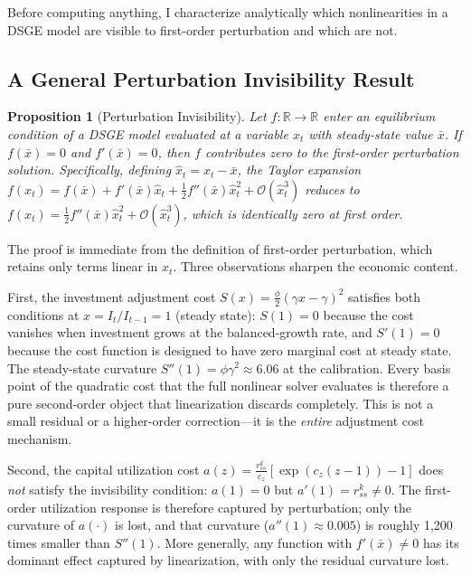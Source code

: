 \documentclass[12pt]{article}
\theoremstyle{plain}
\newtheorem{proposition}[theorem]{Proposition}
\theoremstyle{definition}
\theoremstyle{remark}
\begin{document}
Before computing anything, I characterize analytically which nonlinearities in a DSGE model are visible to first-order perturbation and which are not.

\subsection{A General Perturbation Invisibility Result}

\begin{proposition}[Perturbation Invisibility]
\label{prop:invisibility}
Let $f: \mathbb{R} \to \mathbb{R}$ enter an equilibrium condition of a DSGE model evaluated at a variable $x_t$ with steady-state value $\bar{x}$. If $f(\bar{x}) = 0$ and $f'(\bar{x}) = 0$, then $f$ contributes zero to the first-order perturbation solution. Specifically, defining $\hat{x}_t = x_t - \bar{x}$, the Taylor expansion $f(x_t) = f(\bar{x}) + f'(\bar{x})\hat{x}_t + \tfrac{1}{2}f''(\bar{x})\hat{x}_t^2 + \mathcal{O}(\hat{x}_t^3)$ reduces to $f(x_t) = \tfrac{1}{2}f''(\bar{x})\hat{x}_t^2 + \mathcal{O}(\hat{x}_t^3)$, which is identically zero at first order.
\end{proposition}

The proof is immediate from the definition of first-order perturbation, which retains only terms linear in $\hat{x}_t$. Three observations sharpen the economic content.

First, the investment adjustment cost $S(x) = \tfrac{\phi}{2}(\gamma x - \gamma)^2$ satisfies both conditions at $x = I_t/I_{t-1} = 1$ (steady state): $S(1) = 0$ because the cost vanishes when investment grows at the balanced-growth rate, and $S'(1) = 0$ because the cost function is designed to have zero marginal cost at steady state. The steady-state curvature $S''(1) = \phi\gamma^2 \approx 6.06$ at the \citet{smets2007shocks} calibration. Every basis point of the quadratic cost that the full nonlinear solver evaluates is therefore a pure second-order object that linearization discards completely. This is not a small residual or a higher-order correction---it is the \emph{entire} adjustment cost mechanism.

Second, the capital utilization cost $a(z) = \tfrac{r^k_{ss}}{c_z}[\exp(c_z(z-1)) - 1]$ does \emph{not} satisfy the invisibility condition: $a(1) = 0$ but $a'(1) = r^k_{ss} \neq 0$. The first-order utilization response is therefore captured by perturbation; only the curvature of $a(\cdot)$ is lost, and that curvature ($a''(1) \approx 0.005$) is roughly 1,200 times smaller than $S''(1)$. More generally, any function with $f'(\bar{x}) \neq 0$ has its dominant effect captured by linearization, with only the residual curvature lost.
\end{document}
